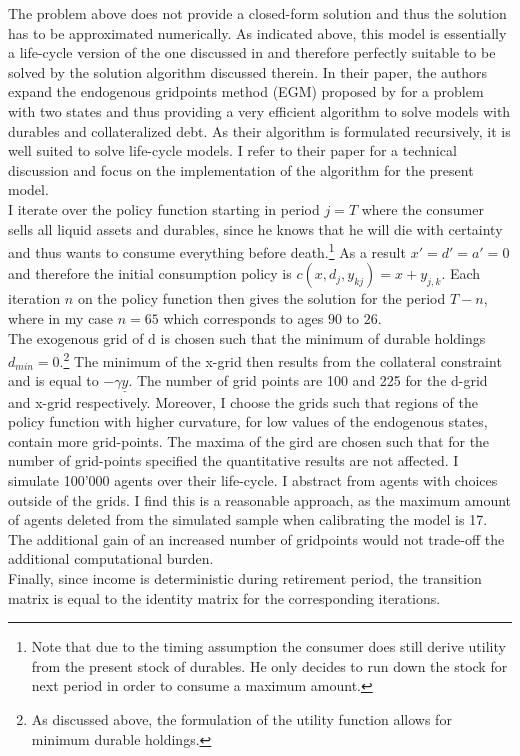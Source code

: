 \documentclass[a4paper,12pt,legno]{article}
\begin{document}
The problem above does not provide a closed-form solution and thus the solution has to be approximated numerically. As indicated above, this model is essentially a life-cycle version of the one discussed in \cite{hintermaier2010} and therefore perfectly suitable to be solved by the solution algorithm discussed therein. In their paper, the authors expand the endogenous gridpoints method (EGM) proposed by \cite{carroll2006} for a problem with two states and thus providing a very efficient algorithm to solve models with durables and collateralized debt. As their algorithm is formulated recursively, it is well suited to solve life-cycle models. I refer to their paper for a technical discussion and focus on the implementation of the algorithm for the present model.\\
I iterate over the policy function starting in period $j = T$ where the consumer sells all liquid assets and durables, since he knows that he will die with certainty and thus wants to consume everything before death.\footnote{Note that due to the timing assumption the consumer does still derive utility from the present stock of durables. He only decides to run down the stock for next period in order to consume a maximum amount.} As a result $x'=d'=a'=0$ and therefore the initial consumption policy is $c(x,d_{j},y_{kj})=x+y_{j,k}$. Each iteration $n$ on the policy function then gives the solution for the period $T-n$, where in my case $n=65$ which corresponds to ages $90$ to $26$. \\
The exogenous grid of d is chosen such that the minimum of durable holdings $d_{min} = 0$.\footnote{As discussed above, the formulation of the utility function allows for minimum durable holdings.} The minimum of the x-grid then results from the collateral constraint and is equal to $-\gamma\underline{y}$. The number of grid points are 100 and 225 for the d-grid and x-grid respectively. Moreover, I choose the grids such that regions of the policy function with higher curvature, for low values of the endogenous states, contain more grid-points. The maxima of the gird are chosen such that for the number of grid-points specified the quantitative results are not affected. I simulate 100'000 agents over their life-cycle. I abstract from agents with choices outside of the grids. I find this is a reasonable approach, as the maximum amount of agents deleted from the simulated sample when calibrating the model is 17. The additional gain of an increased number of gridpoints would not trade-off the additional computational burden.\\
Finally, since income is deterministic during retirement period, the transition matrix is equal to the identity matrix for the corresponding iterations.
\end{document}
